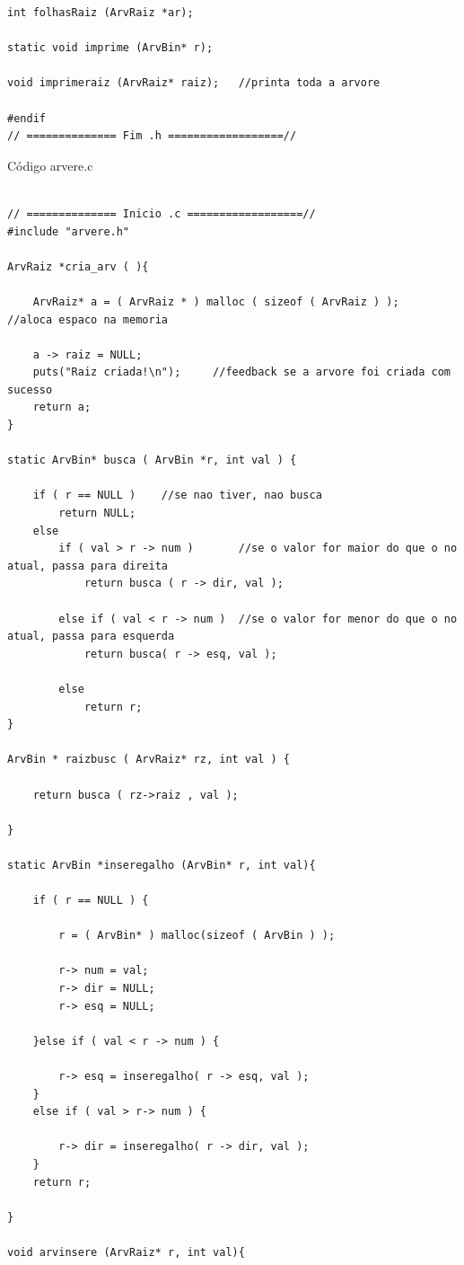 \documentclass[11pt]{article} %
\begin{document}
\begin{enumerate}[a)]
\begin{lstlisting}
int folhasRaiz (ArvRaiz *ar);

static void imprime (ArvBin* r);

void imprimeraiz (ArvRaiz* raiz);	//printa toda a arvore

#endif
// ============== Fim .h ==================//

			\end{lstlisting}


\begin{center}
Código arvere.c
\end{center}

			\begin{lstlisting}

// ============== Inicio .c ==================//
#include "arvere.h"

ArvRaiz *cria_arv ( ){
	
	ArvRaiz* a = ( ArvRaiz * ) malloc ( sizeof ( ArvRaiz ) );	//aloca espaco na memoria
	
	a -> raiz = NULL;
	puts("Raiz criada!\n");		//feedback se a arvore foi criada com sucesso
	return a;
}

static ArvBin* busca ( ArvBin *r, int val ) {
	
	if ( r == NULL )	//se nao tiver, nao busca
		return NULL;
	else
		if ( val > r -> num )		//se o valor for maior do que o no atual, passa para direita
			return busca ( r -> dir, val );
			
		else if ( val < r -> num ) 	//se o valor for menor do que o no atual, passa para esquerda
			return busca( r -> esq, val );
			
		else 
			return r;
}

ArvBin * raizbusc ( ArvRaiz* rz, int val ) {

	return busca ( rz->raiz , val );	

}

static ArvBin *inseregalho (ArvBin* r, int val){

	if ( r == NULL ) { 

		r = ( ArvBin* ) malloc(sizeof ( ArvBin ) ); 
		
		r-> num = val;
		r-> dir = NULL;
		r-> esq = NULL;
			
	}else if ( val < r -> num ) {

		r-> esq = inseregalho( r -> esq, val );
	}
	else if ( val > r-> num ) { 

		r-> dir = inseregalho( r -> dir, val );
	}
	return r;	

}

void arvinsere (ArvRaiz* r, int val){


\end{lstlisting}
\end{enumerate}
\end{document}
